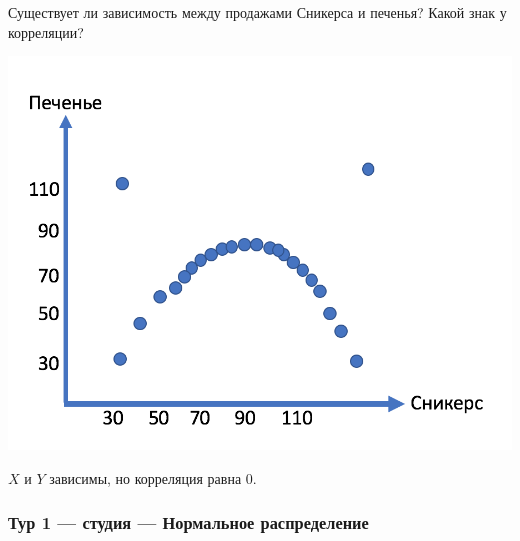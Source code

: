 \begin{enumerate}
\begin{problem}
Существует ли зависимость между продажами Сникерса и печенья? Какой знак у корреляции?

\includegraphics[scale=0.5]{images/No_correlation}

\begin{sol}
$X$ и $Y$ зависимы, но корреляция равна $0$.
\end{sol}
\end{problem}
\end{enumerate}


\newpage
\subsubsection{Тур 1 — студия — Нормальное распределение}


